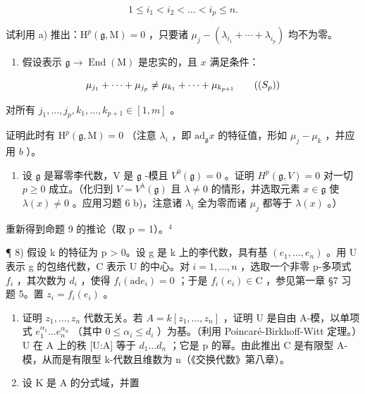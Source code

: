 \[
1 \leq i _ {1} <   i _ {2} <   \dots <   i _ {p} \leq n.
\]

试利用 a) 推出：\(\mathrm{H}^{p}(\mathfrak{g},\mathrm{M})=0\) ，只要诸 \(\mu_{j}-(\lambda_{i_{1}}+\cdots+\lambda_{i_{p}})\) 均不为零。

\begin{enumerate}
\def\labelenumi{\alph{enumi})}
\setcounter{enumi}{2}
\tightlist
\item
  假设表示 \(\mathfrak{g} \to \operatorname{End}(\mathrm{M})\) 是忠实的，且 \(x\) 满足条件：
\end{enumerate}

\[
\mu_ {j _ {1}} + \dots + \mu_ {j _ {p}} \neq \mu_ {k _ {1}} + \dots + \mu_ {k _ {p + 1}}\tag{($S_{p}$)}
\]

对所有 \(j_{1},\ldots,j_{p},k_{1},\ldots,k_{p+1}\in[1,m]\) 。

证明此时有 \(\mathrm{H}^p (\mathfrak{g},\mathrm{M}) = 0\) （注意 \(\lambda_{i}\) ，即 \(\mathrm{ad}_{\mathfrak{g}}x\) 的特征值，形如 \(\mu_j - \mu_k\) ，并应用 \(b\) ）。

\begin{enumerate}
\def\labelenumi{\arabic{enumi})}
\setcounter{enumi}{6}
\tightlist
\item
  设 \(\mathfrak{g}\) 是幂零李代数，V 是 \(\mathfrak{g}\) -模且 \(V^0(\mathfrak{g}) = 0\) 。证明 \(H^p(\mathfrak{g}, V) = 0\) 对一切 \(p \geq 0\) 成立。（化归到 \(V = V^\lambda(\mathfrak{g})\) 且 \(\lambda \neq 0\) 的情形，并选取元素 \(x \in \mathfrak{g}\) 使 \(\lambda(x) \neq 0\) 。应用习题 6 b)，注意诸 \(\lambda_i\) 全为零而诸 \(\mu_j\) 都等于 \(\lambda(x)\) 。）
\end{enumerate}

重新得到命题 9 的推论（取 p = 1）。\(^{4}\)

¶ 8) 假设 k 的特征为 p \textgreater{} 0。设 g 是 k 上的李代数，具有基 \((e_{1},\ldots,e_{n})\) 。用 U 表示 g 的包络代数，C 表示 U 的中心。对 \(i = 1,\ldots,n\) ，选取一个非零 p-多项式 \(f_{i}\) ，其次数为 \(d_{i}\) ，使得 \(f_{i}(\mathrm{ad}e_{i}) = 0\) ；于是 \(f_{i}(e_{i}) \in \mathrm{C}\) ，参见第一章 §7 习题 5。置 \(z_{i} = f_{i}(e_{i})\) 。

\begin{enumerate}
\def\labelenumi{\alph{enumi})}
\item
  证明 \(z_{1},\ldots,z_{n}\) 代数无关。若 \(A=k[z_{1},\ldots,z_{n}]\) ，证明 U 是自由 A-模，以单项式 \(e_{1}^{\alpha_{1}}\ldots e_{n}^{\alpha_{n}}\) （其中 \(0\leq\alpha_{i}\leq d_{i}\) ）为基。（利用 Poincaré-Birkhoff-Witt 定理。）U 在 A 上的秩 {[}U:A{]} 等于 \(d_{1}\ldots d_{n}\) ；它是 p 的幂。由此推出 C 是有限型 A-模，从而是有限型 k-代数且维数为 n（《交换代数》第八章）。
\item
  设 \(\mathrm{K}\) 是 \(\mathrm{A}\) 的分式域，并置
\end{enumerate}

